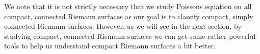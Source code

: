 \documentclass[11pt]{report}
\theoremstyle{definition}
\begin{document}
We note that it is not strictly necessary that we study Poissons equation on all compact, connected Riemann surfaces as our goal is to classify compact, simply connected Riemann surfaces. However, as we will see in the next section, by studying compact, connected Riemann surfaces we can get some rather powerful tools to help us understand compact Riemann surfaces a bit better.

\end{document}
